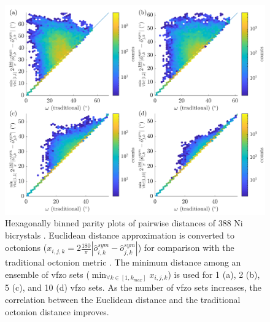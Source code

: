 \documentclass[preprint,12pt]{elsarticle}
\begin{document}
\begin{figure}
    \centering
    \includegraphics[scale=1]{figures/dist-ensemble-k1-2-5-10.png}
    \caption{Hexagonally binned parity plots of pairwise distances of 388 Ni bicrystals \cite{olmstedSurveyComputedGrain2009a}. Euclidean distance approximation is converted to octonions ($x_{i,j,k}=2\frac{180}{\pi}|\hat{o}_{i,k}^{sym}-\hat{o}_{j,k}^{sym}|$) for comparison with the traditional octonion metric \cite{chesserLearningGrainBoundary2020}. The minimum distance among an ensemble of \gls{vfzo} sets ($\min_{\forall k \in [1,k_{max}]}x_{i,j,k}$) is used for 1 (a), 2 (b), 5 (c), and 10 (d) \gls{vfzo} sets. As the number of \gls{vfzo} sets increases, the correlation between the Euclidean distance and the traditional octonion distance improves.}
    \label{fig:dist-ensemble-k1-2-5-10}
\end{figure}
\end{document}
